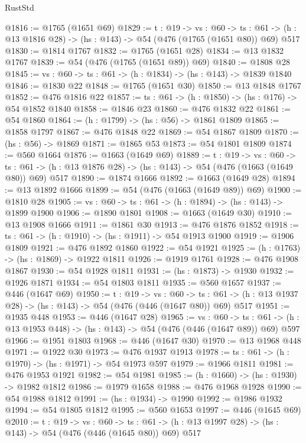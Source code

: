 \begin{lexlean}{RustStd}
\begin{coremodule}
@1816 := @1765 (@1651 @69)
@1829 := {t : @19} ->
  {vs : @60} ->
  {ts : @61} -> (h : @13 @1816 @28) -> (hs : @143) -> @54 (@476 (@1765 (@1651 @80)) @69) @517
@1830 := @1814 @1767
@1832 := @1765 (@1651 @28)
@1834 := @13 @1832 @1767
@1839 := @54 (@476 (@1765 (@1651 @89)) @69)
@1840 := @1808 @28
@1845 := {vs : @60} -> {ts : @61} -> (h : @1834) -> (hs : @143) -> @1839 @1840
@1846 := @1830 @22
@1848 := @1765 (@1651 @30)
@1850 := @13 @1848 @1767
@1852 := @476 @1816 @22
@1857 := {ts : @61} -> (h : @1850) -> (hs : @176) -> @54 @1852 @1840
@1858 := @1846 @23
@1860 := @476 @1832 @22
@1861 := @54 @1860
@1864 := (h : @1799) -> (hs : @56) -> @1861 @1809
@1865 := @1858 @1797
@1867 := @476 @1848 @22
@1869 := @54 @1867 @1809
@1870 := (hs : @56) -> @1869
@1871 := @1865 @53
@1873 := @54 @1801 @1809
@1874 := @560 @1664
@1876 := @1663 (@1649 @69)
@1889 := {t : @19} ->
  {vs : @60} ->
  {ts : @61} -> (h : @13 @1876 @28) -> (hs : @143) -> @54 (@476 (@1663 (@1649 @80)) @69) @517
@1890 := @1874 @1666
@1892 := @1663 (@1649 @28)
@1894 := @13 @1892 @1666
@1899 := @54 (@476 (@1663 (@1649 @89)) @69)
@1900 := @1810 @28
@1905 := {vs : @60} -> {ts : @61} -> (h : @1894) -> (hs : @143) -> @1899 @1900
@1906 := @1890 @1801
@1908 := @1663 (@1649 @30)
@1910 := @13 @1908 @1666
@1911 := @1861 @30
@1913 := @476 @1876 @1852
@1918 := {ts : @61} -> (h : @1910) -> (hs : @1911) -> @54 @1913 @1900
@1919 := @1906 @1809
@1921 := @476 @1892 @1860
@1922 := @54 @1921
@1925 := (h : @1763) -> (hs : @1869) -> @1922 @1811
@1926 := @1919 @1761
@1928 := @476 @1908 @1867
@1930 := @54 @1928 @1811
@1931 := (hs : @1873) -> @1930
@1932 := @1926 @1871
@1934 := @54 @1803 @1811
@1935 := @560 @1657
@1937 := @446 (@1647 @69)
@1950 := {t : @19} ->
  {vs : @60} ->
  {ts : @61} -> (h : @13 @1937 @28) -> (hs : @143) -> @54 (@476 (@446 (@1647 @80)) @69) @517
@1951 := @1935 @448
@1953 := @446 (@1647 @28)
@1965 := {vs : @60} ->
  {ts : @61} -> (h : @13 @1953 @448) -> (hs : @143) -> @54 (@476 (@446 (@1647 @89)) @69) @597
@1966 := @1951 @1803
@1968 := @446 (@1647 @30)
@1970 := @13 @1968 @448
@1971 := @1922 @30
@1973 := @476 @1937 @1913
@1978 := {ts : @61} -> (h : @1970) -> (hs : @1971) -> @54 @1973 @597
@1979 := @1966 @1811
@1981 := @476 @1953 @1921
@1982 := @54 @1981
@1985 := (h : @1660) -> (hs : @1930) -> @1982 @1812
@1986 := @1979 @1658
@1988 := @476 @1968 @1928
@1990 := @54 @1988 @1812
@1991 := (hs : @1934) -> @1990
@1992 := @1986 @1932
@1994 := @54 @1805 @1812
@1995 := @560 @1653
@1997 := @446 (@1645 @69)
@2010 := {t : @19} ->
  {vs : @60} ->
  {ts : @61} -> (h : @13 @1997 @28) -> (hs : @143) -> @54 (@476 (@446 (@1645 @80)) @69) @517

\end{coremodule}
\end{lexlean}
